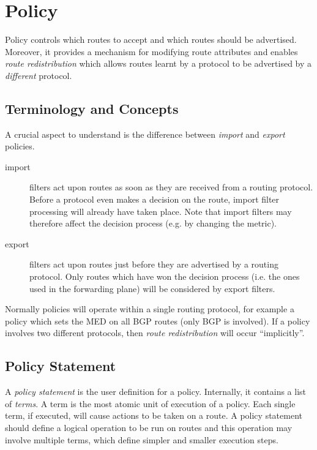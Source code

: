 %
%

\chapter{\label{policy}Policy}
Policy controls which routes to accept and which routes should be advertised.
Moreover, it provides a mechanism for modifying route attributes and enables
{\em route redistribution} which allows routes learnt by a protocol to be
advertised by a {\em different} protocol.


\section{Terminology and Concepts}
A crucial aspect to understand is the difference between {\em import} and {\em
export} policies.
%
\begin{description}
\item[import] filters act upon routes as soon as they are received from a
routing protocol.  Before a protocol even makes a decision on the route, import
filter processing will already have taken place.  Note that import filters may
therefore affect the decision process (e.g. by changing the metric).
%
\item[export] filters act upon routes just before they are advertised by a
routing protocol.  Only routes which have won the decision process (i.e. the
ones used in the forwarding plane) will be considered by export filters.
\end{description}

Normally policies will operate within a single routing protocol, for example  a
policy which sets the MED on all BGP routes (only BGP is involved).  If a policy
involves two different protocols, then {\em route redistribution} will occur
``implicitly''.

\section{Policy Statement}
A {\em policy statement} is the user definition for a policy.  Internally, it
contains a list of {\em terms}.  A term is the most atomic unit of execution of
a policy.  Each single term, if executed, will cause actions to be taken on a
route.  A policy statement should define a logical operation to be run on
routes and this operation may involve multiple terms, which define simpler and
smaller execution steps.

